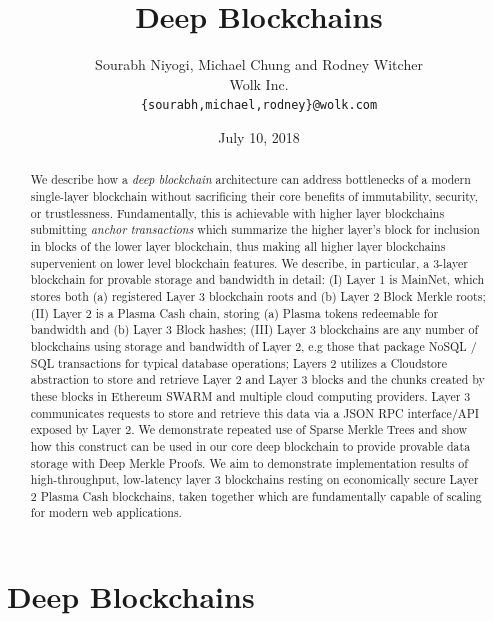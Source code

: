 \documentclass{article}
\title{Deep Blockchains}
\author{Sourabh Niyogi, Michael Chung and Rodney Witcher\\Wolk Inc.\\
{\tt \{sourabh,michael,rodney\}@wolk.com}}
\date{July 10, 2018}
\begin{document}
\maketitle

\begin{abstract}
We describe how a {\em deep blockchain} architecture can address bottlenecks of a modern single-layer blockchain without sacrificing their core benefits of immutability, security, or trustlessness.  Fundamentally, this is achievable with higher layer blockchains submitting {\em anchor transactions} which summarize the higher layer's block for inclusion in blocks of the lower layer blockchain, thus making all higher layer blockchains supervenient on lower level blockchain features.   We describe, in particular, a 3-layer blockchain for provable storage and bandwidth in detail: (I) Layer 1 is MainNet, which stores both (a) registered Layer 3 blockchain roots and (b) Layer 2 Block Merkle roots; (II) Layer 2 is a Plasma Cash chain, storing (a) Plasma tokens redeemable for bandwidth and (b) Layer 3 Block hashes; (III) Layer 3 blockchains are any number of blockchains using storage and bandwidth of Layer 2, e.g those that package NoSQL / SQL transactions for typical database operations;  Layers 2 utilizes a Cloudstore abstraction to store and retrieve Layer 2 and Layer 3 blocks and the chunks created by these blocks in Ethereum SWARM and multiple cloud computing providers.  Layer 3 communicates requests to store and retrieve this data via a JSON RPC interface/API exposed by Layer 2.  We demonstrate repeated use of Sparse Merkle Trees and show how this construct can be used in our core deep blockchain to provide provable data storage with Deep Merkle Proofs.  We aim to demonstrate implementation results of high-throughput, low-latency layer 3 blockchains resting on  economically secure Layer 2 Plasma Cash blockchains, taken together which are fundamentally capable of scaling for modern web applications.
\end{abstract} 

\section{Deep Blockchains}
\end{document}
